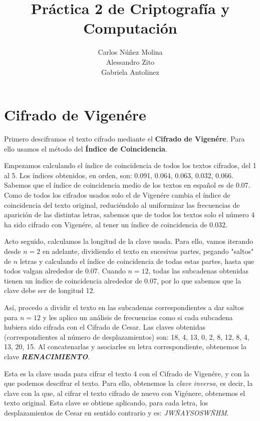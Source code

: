 \documentclass{article}
\title{Práctica 2 de Criptografía y Computación}
\date{}
\author{Carlos Núñez Molina \\ Alessandro Zito \\ Gabriela Antolinez}
\begin{document}
	\maketitle
	\newpage	
	
	\section{Cifrado de Vigenére}
	Primero desciframos el texto cifrado mediante el \textbf{Cifrado de Vigenére}. Para ello usamos el método del \textbf{Índice de Coincidencia}.
	
	Empezamos calculando el índice de coincidencia de todos los textos cifrados, del 1 al 5. Los índices obtenidos, en orden, son: 0.091, 0.064, 0.063, 0.032, 0.066. Sabemos que el índice de coincidencia medio de los textos en español es de 0.07. Como de todos los cifrados usados solo el de Vigenére cambia el índice de coincidencia del texto original, reduciéndolo al uniformizar las frecuencias de aparición de las distintas letras, sabemos que de todos los textos solo el número 4 ha sido cifrado con Vigenére, al tener un índice de coincidencia de 0.032.
	
	Acto seguido, calculamos la longitud de la clave usada. Para ello, vamos iterando desde $n=2$ en adelante, dividiendo el texto en sucesivas partes, pegando "saltos" de $n$ letras y calculando el índice de coincidencia de todas estas partes, hasta que todos valgan alrededor de 0.07. Cuando $n=12$, todas las subcadenas obtenidas tienen un índice de coincidencia alrededor de 0.07, por lo que sabemos que la clave debe ser de longitud 12.
	
	Así, procedo a dividir el texto en las subcadenas correspondientes a dar saltos para $n=12$ y les aplico un análisis de frecuencias como si cada subcadena hubiera sido cifrada con el Cifrado de Cesar. Las claves obtenidas (correspondientes al número de desplazamientos) son: 18, 4, 13, 0, 2, 8, 12, 8, 4, 13, 20, 15. Al concatenarlas y asociarles su letra correspondiente, obtenemos la clave \textbf{\emph{RENACIMIENTO}}.
	
	Esta es la clave usada para cifrar el texto 4 con el Cifrado de Vigenére, y con la que podemos descifrar el texto. Para ello, obtenemos la \emph{clave inversa}, es decir, la clave con la que, al cifrar el texto cifrado de nuevo con Vigénere, obtenemos el texto original. Esta clave se obtiene aplicando, para cada letra, los desplazamientos de Cesar en sentido contrario y es: {\emph{JWÑAYSOSWÑHM}}.

\newpage
\end{document}
